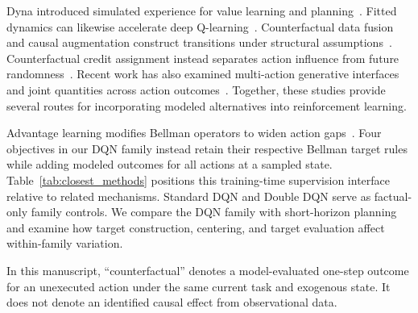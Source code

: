 \documentclass[remotesensing,article,submit,moreauthors]{Definitions/mdpi}
\begin{document}
Dyna introduced simulated experience for value learning and planning~\cite{sutton1991dyna}. Fitted dynamics can likewise accelerate deep Q-learning~\cite{gu2016continuous}. Counterfactual data fusion and causal augmentation construct transitions under structural assumptions~\cite{forney2017counterfactual,armengol2024caiac}. Counterfactual credit assignment instead separates action influence from future randomness~\cite{mesnard2021counterfactual}. Recent work has also examined multi-action generative interfaces and joint quantities across action outcomes~\cite{kaya2026joint}. Together, these studies provide several routes for incorporating modeled alternatives into reinforcement learning.

Advantage learning modifies Bellman operators to widen action gaps~\cite{bellemare2016gap}. Four objectives in our DQN family instead retain their respective Bellman target rules while adding modeled outcomes for all actions at a sampled state. Table~\ref{tab:closest_methods} positions this training-time supervision interface relative to related mechanisms. Standard DQN and Double DQN serve as factual-only family controls. We compare the DQN family with short-horizon planning and examine how target construction, centering, and target evaluation affect within-family variation.

In this manuscript, ``counterfactual'' denotes a model-evaluated one-step outcome for an unexecuted action under the same current task and exogenous state. It does not denote an identified causal effect from observational data.
\end{document}
